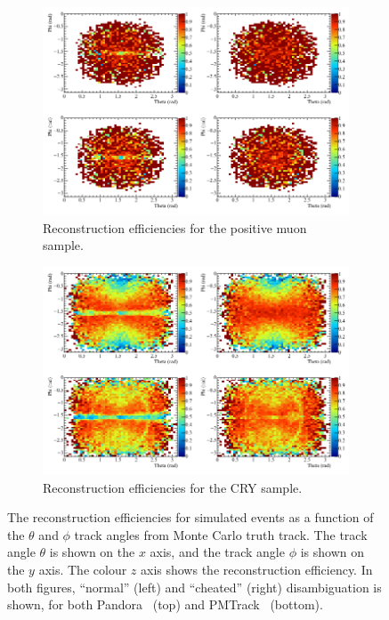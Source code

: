 \begin{figure}
  \centering
  \begin{subfigure}{0.8\textwidth}
    \centering
    \includegraphics[width=\textwidth]{Effic_AntiMuon_500V_All_PhiTheta}
    \caption{Reconstruction efficiencies for the positive muon sample.}
    \label{fig:SimEffic_ThetaPhi_AMu}
  \end{subfigure}
  \begin{subfigure}{0.8\textwidth}
    \centering
    \includegraphics[width=\textwidth]{Effic_Cosmics_500V_All_PhiTheta}
    \caption{Reconstruction efficiencies for the CRY sample.}
    \label{fig:SimEffic_ThetaPhi_CRY}
  \end{subfigure}
  \caption[The reconstruction efficiencies for simulated events as a function of the $\theta$ and $\phi$ track angles from Monte Carlo truth track.]
          {The reconstruction efficiencies for simulated events as a function of the $\theta$ and $\phi$ track angles from Monte Carlo truth track. The track angle $\theta$ is shown on the $x$ axis, and the track angle $\phi$ is shown on the $y$ axis. The colour $z$ axis shows the reconstruction efficiency. In both figures, ``normal'' (left) and ``cheated'' (right) disambiguation is shown, for both Pandora~\citep{Pandora} (top) and PMTrack~\citep{PMTrack} (bottom).}
          \label{fig:SimEffic_ThetaPhi}
\end{figure}

